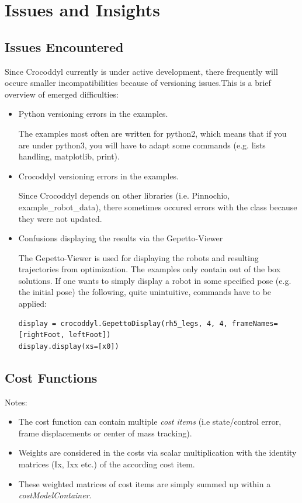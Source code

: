 \section{Issues and Insights}
\subsection{Issues Encountered}
Since Crocoddyl currently is under active development, there frequently will occure smaller incompatibilities because of versioning issues.This is a brief overview of emerged difficulties:
\begin{itemize}
\item Python versioning errors in the examples. 

The examples most often are written for python2, which means that if you are under python3, you will have to adapt some commands (e.g. lists handling, matplotlib, print).
\item Crocoddyl versioning errors in the examples. 

Since Crocoddyl depends on other libraries (i.e. Pinnochio, example\_robot\_data), there sometimes occured errors with the class because they were not updated. 
\item Confusions displaying the results via the Gepetto-Viewer

The Gepetto-Viewer is used for displaying the robots and resulting trajectories from optimization. The examples only contain out of the box solutions. If one wants to simply display a robot in some specified pose (e.g. the initial pose) the following, quite unintuitive, commands have to be applied:
\begin{verbatim}
display = crocoddyl.GepettoDisplay(rh5_legs, 4, 4, frameNames=[rightFoot, leftFoot])
display.display(xs=[x0])
\end{verbatim}
\end{itemize}

\subsection{Cost Functions}
Notes:
\begin{itemize}
\item The cost function can contain multiple \textit{cost items} (i.e state/control error, frame displacements or center of mass tracking).
\item Weights are considered in the costs via scalar multiplication with the identity matrices (Ix, Ixx etc.) of the according cost item. 
\item These weighted matrices of cost items are simply summed up within a \textit{costModelContainer}.
\end{itemize}

